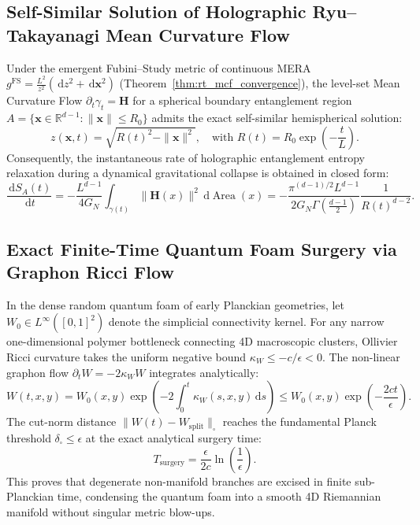 \documentclass[11pt,a4paper,reqno]{amsart}
\theoremstyle{definition}
\numberwithin{equation}{section}
\providecommand{\R}{\mathbb{R}}
\providecommand{\Area}{\operatorname{Area}}
\providecommand{\cutnorm}[1]{\|#1\|_{\square}}
\newcommand{\dif}{\,\mathrm{d}}
\providecommand{\R}{\mathbb{R}}
\providecommand{\Area}{\mathrm{Area}}
\providecommand{\cutnorm}[1]{\|#1\|_{\square}}
\begin{document}
\subsection{Self-Similar Solution of Holographic Ryu--Takayanagi Mean Curvature Flow}
Under the emergent Fubini--Study metric of continuous MERA $g^{\mathrm{FS}} = \frac{L^2}{z^2}(\dif z^2 + \dif \mathbf{x}^2)$ (Theorem~\ref{thm:rt_mcf_convergence}), the level-set Mean Curvature Flow $\partial_t \gamma_t = \mathbf{H}$ for a spherical boundary entanglement region $A = \{ \mathbf{x} \in \R^{d-1} \colon \|\mathbf{x}\| \le R_0 \}$ admits the exact self-similar hemispherical solution:
\begin{equation}
    z(\mathbf{x}, t) = \sqrt{R(t)^2 - \|\mathbf{x}\|^2}, \quad \text{with } R(t) = R_0 \exp\left( -\frac{t}{L} \right).
\end{equation}
Consequently, the instantaneous rate of holographic entanglement entropy relaxation during a dynamical gravitational collapse is obtained in closed form:
\begin{equation}
    \label{eq:exact_mcf_entropy_decay}
    \frac{\dif S_A(t)}{\dif t} = -\frac{L^{d-1}}{4 G_N} \int_{\gamma(t)} \|\mathbf{H}(x)\|^2 \dif \Area(x) = -\frac{\pi^{(d-1)/2} L^{d-1}}{2 G_N \Gamma\left(\frac{d-1}{2}\right)} \frac{1}{R(t)^{d-2}}.
\end{equation}

\subsection{Exact Finite-Time Quantum Foam Surgery via Graphon Ricci Flow}
In the dense random quantum foam of early Planckian geometries, let $W_0 \in L^\infty([0, 1]^2)$ denote the simplicial connectivity kernel. For any narrow one-dimensional polymer bottleneck connecting 4D macroscopic clusters, Ollivier Ricci curvature takes the uniform negative bound $\kappa_W \le -c/\epsilon < 0$. The non-linear graphon flow $\partial_t W = -2\kappa_W W$ integrates analytically:
\begin{equation}
    W(t, x, y) = W_0(x, y) \exp\left( -2 \int_0^t \kappa_W(s, x, y) \dif s \right) \le W_0(x, y) \exp\left( -\frac{2 c t}{\epsilon} \right).
\end{equation}
The cut-norm distance $\cutnorm{W(t) - W_{\mathrm{split}}}$ reaches the fundamental Planck threshold $\delta_\square \le \epsilon$ at the exact analytical surgery time:
\begin{equation}
    \label{eq:exact_surgery_time}
    T_{\mathrm{surgery}} = \frac{\epsilon}{2 c} \ln\left( \frac{1}{\epsilon} \right).
\end{equation}
This proves that degenerate non-manifold branches are excised in finite sub-Planckian time, condensing the quantum foam into a smooth 4D Riemannian manifold without singular metric blow-ups.
\end{document}
